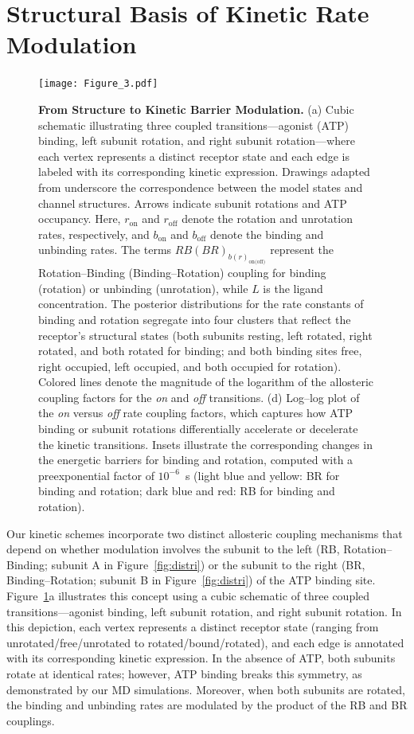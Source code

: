 \documentclass[pdflatex,sn-nature]{sn-jnl}%
\begin{document}
\section{Structural Basis of Kinetic Rate Modulation}
\begin{figure}[!htbp]
	\centering
	\texttt{[image: Figure\_3.pdf]}
	\caption{\textbf{From Structure to Kinetic Barrier Modulation.} (a) Cubic schematic illustrating three coupled transitions—agonist (ATP) binding, left subunit rotation, and right subunit rotation—where each vertex represents a distinct receptor state and each edge is labeled with its corresponding kinetic expression. Drawings adapted from \cite{abierta_p2x} underscore the correspondence between the model states and channel structures. Arrows indicate subunit rotations and ATP occupancy. Here, $r_{\text{on}}$ and $r_{\text{off}}$ denote the rotation and unrotation rates, respectively, and $b_{\text{on}}$ and $b_{\text{off}}$ denote the binding and unbinding rates. The terms $RB(BR)_{b(r)_{\text{on(off)}}}$ represent the Rotation–Binding (Binding–Rotation) coupling for binding (rotation) or unbinding (unrotation), while $L$ is the ligand concentration. The posterior distributions for the rate constants of binding and rotation segregate into four clusters that reflect the receptor’s structural states (both subunits resting, left rotated, right rotated, and both rotated for binding; and both binding sites free, right occupied, left occupied, and both occupied for rotation). Colored lines denote the magnitude of the logarithm of the allosteric coupling factors for the \textit{on} and \textit{off} transitions. (d) Log–log plot of the \textit{on} versus \textit{off} rate coupling factors, which captures how ATP binding or subunit rotations differentially accelerate or decelerate the kinetic transitions. Insets illustrate the corresponding changes in the energetic barriers for binding and rotation, computed with a preexponential factor of $10^{-6}$~s (light blue and yellow: BR for binding and rotation; dark blue and red: RB for binding and rotation).}
	\label{fig:rates_SchemeX}
\end{figure}

Our kinetic schemes incorporate two distinct allosteric coupling mechanisms that depend on whether modulation involves the subunit to the left (RB, Rotation–Binding; subunit A in Figure~\ref{fig:distri}) or the subunit to the right (BR, Binding–Rotation; subunit B in Figure~\ref{fig:distri}) of the ATP binding site. Figure~\ref{fig:rates_SchemeX}a illustrates this concept using a cubic schematic of three coupled transitions—agonist binding, left subunit rotation, and right subunit rotation. In this depiction, each vertex represents a distinct receptor state (ranging from unrotated/free/unrotated to rotated/bound/rotated), and each edge is annotated with its corresponding kinetic expression. In the absence of ATP, both subunits rotate at identical rates; however, ATP binding breaks this symmetry, as demonstrated by our MD simulations. Moreover, when both subunits are rotated, the binding and unbinding rates are modulated by the product of the RB and BR couplings.
\end{document}
